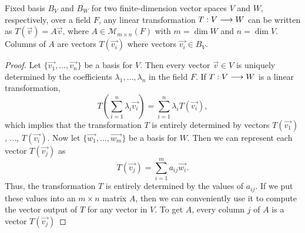 

\begin{prop}
    Fixed basis $B_V$ and $B_W$ for two finite-dimension vector spaces $V$ and $W$, respectively, over a field
    $F$, any linear transformation $T : V\longrightarrow W$ can be written as $T\left( \vec{v} \right) = A\vec{v}$, where $A\in\mathcal{M}_{m\times n}\left( F\right)$
    with $m = \dim W$ and $n = \dim V$. Columns of $A$ are vectors $T\left( \vec{v_i} \right)$ where
    vectors $\vec{v_i}\in B_V$.
\end{prop}

\begin{proof}
    Let $\{\vec{v_1}, \ldots, \vec{v_n}\} $ be a basis for $V$. Then every vector $\vec{v}\in V$ is uniquely
    determined by the coefficients $\lambda_1, \ldots, \lambda_n$ in the field $F$. If $T : V\longrightarrow W$ is
    a linear transformation,
    \begin{equation}
        T\left( \sum_{i=1}^n\lambda_i \vec{v_i} \right) = \sum_{i=1}^n\lambda_i T\left( \vec{v_i} \right),
    \end{equation}
    which implies that the transformation $T$ is entirely determined by vectors $T\left( \vec{v_1} \right)$,
    $\ldots$, $T\left( \vec{v_i} \right) $. Now let $\{\vec{w_1}, \ldots, \vec{w_m}\} $ be a basis for $W$.
    Then we can represent each vector $T\left( \vec{v_j} \right) $ as
    \begin{equation}
        T\left( \vec{v_j} \right) = \sum_{i=1}^m a_{ij}\vec{w_i}.
    \end{equation}
    Thus, the transformation $T$ is entirely determined by the values of $a_{ij}$. If we put these values
    into an $m\times n$ matrix $A$, then we can conveniently use it to compute the vector output of $T$ for
    any vector in $V$. To get $A$, every column $j$ of $A$ is a vector $T\left( \vec{v_j} \right) $
\end{proof}

